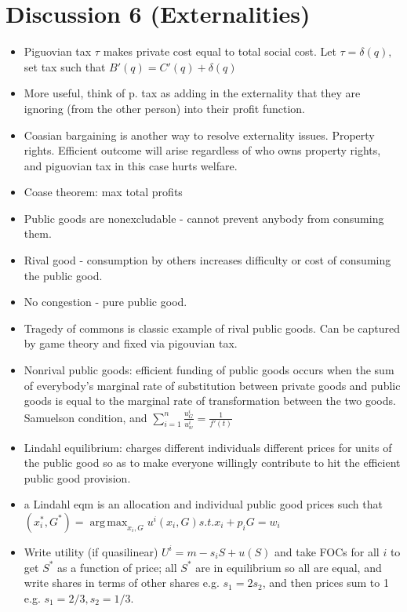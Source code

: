 \documentclass[11pt]{article} %
\DeclareMathOperator*{\argmax}{arg\,max}
\begin{document}
\section{Discussion 6 (Externalities)}
\begin{itemize}
\item Piguovian tax $\tau$ makes private cost equal to total social cost. Let $\tau = \delta(q),$ set tax such that $B'(q) = C'(q) + \delta(q)$
\item More useful, think of p. tax as adding in the externality that they are ignoring (from the other person) into their profit function.
\item Coasian bargaining is another way to resolve externality issues. Property rights. Efficient outcome will arise regardless of who owns property rights, and piguovian tax in this case hurts welfare.
\item Coase theorem: max total profits
\item Public goods are nonexcludable - cannot prevent anybody from consuming them.
\item Rival good - consumption by others increases difficulty or cost of consuming the public good.
\item No congestion - pure public good.
\item Tragedy of commons is classic example of rival public goods. Can be captured by game theory and fixed via pigouvian tax.
\item Nonrival public goods: efficient funding of public goods occurs when the sum of everybody's marginal rate of substitution between private goods and public goods is equal to the marginal rate of transformation between the two goods. Samuelson condition, and $\sum_{i=1}^n \frac{u^i_G}{u^i_w}  = \frac{1}{f'(t)}$
\item Lindahl equilibrium: charges different individuals different prices for units of the public good so as to make everyone willingly contribute to hit the efficient public good provision.
\item a Lindahl eqm is an allocation and individual public good prices such that $(x_{i}^{*},G^{*}) = \argmax_{x_i,G}u^i(x_i,G) s.t. x_i + p_iG = w_i$
\item Write utility (if quasilinear) $U^i = m - s_i S + u(S) $ and take FOCs for all $i$ to get $S^{*}$ as a function of price; all $S^{*}$ are in equilibrium so all are equal, and write shares in terms of other shares e.g. $s_1 = 2s_2$, and then prices sum to 1 e.g. $s_1 = 2/3, s_2 = 1/3.$ 
\end{itemize}
\end{document}
